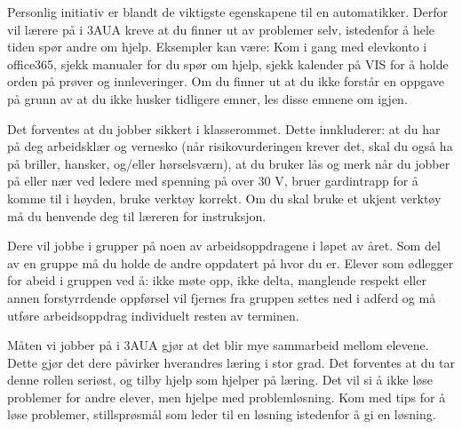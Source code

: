 \vskip 10pt



\noindent
{} Personlig initiativ er blandt de viktigste egenskapene til en automatikker. Derfor vil lærere på i 3AUA kreve at du finner ut av problemer selv, istedenfor å hele tiden spør andre om hjelp. Eksempler kan være: Kom i gang med elevkonto i office365, sjekk manualer for du spør om hjelp, sjekk kalender på VIS for å holde orden på prøver og innleveringer. Om du finner ut at du ikke forstår en oppgave på grunn av at du ikke husker tidligere emner, les disse emnene om igjen. 
\vskip 10pt

\noindent
{} Det forventes at du jobber sikkert i klasserommet. Dette innkluderer: at du har på deg arbeidsklær og vernesko (når risikovurderingen krever det,  skal du også ha på briller, hansker, og/eller hørselsværn), at du bruker lås og merk når du jobber på eller nær ved ledere med spenning på over 30 V, bruer gardintrapp for å komme til i høyden, bruke verktøy korrekt. Om du skal bruke et ukjent verktøy må du henvende deg til læreren for instruksjon. 
\vskip 10pt

\noindent
{} Dere vil jobbe i grupper på noen av arbeidsoppdragene i løpet av året. Som del av en gruppe må du holde de andre oppdatert på hvor du er. Elever som ødlegger for abeid i gruppen  ved å: ikke møte opp, ikke delta, manglende respekt eller annen forstyrrdende oppførsel vil fjernes fra gruppen settes ned i adferd og må utføre arbeidsoppdrag individuelt resten av terminen. 
\vskip 10pt

\noindent
{} Måten vi jobber på i 3AUA gjør at det blir mye sammarbeid mellom elevene. Dette gjør det dere påvirker hverandres læring i stor grad. Det forventes at du tar denne rollen seriøst, og tilby hjelp som hjelper på læring. Det vil si å ikke løse problemer for andre elever, men hjelpe med problemløsning. Kom med tips for å løse problemer, stillsprøsmål som leder til en løsning istedenfor å gi en løsning. 
\vskip 10pt


